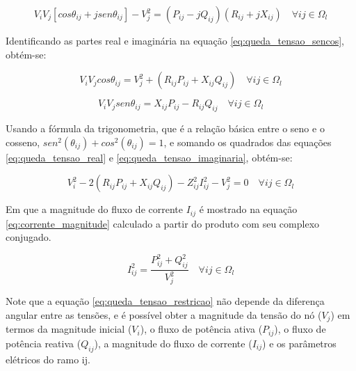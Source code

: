 \begin{equation}
    V_{i}V_{j}[cos\theta_{ij} + jsen\theta_{ij}] - V_{j}^{2} = (P_{ij} - jQ_{ij})(R_{ij} + jX_{ij}) \quad\forall ij \in \Omega_{l}
    \label{eq:queda_tensao_sencos}
\end{equation}

Identificando as partes real e imaginária na equação \ref{eq:queda_tensao_sencos}, obtém-se:

\begin{equation}
    V_{i}V_{j}cos\theta_{ij} = V_{j}^{2} + (R_{ij}P_{ij} + X_{ij}Q_{ij})\quad\forall ij \in \Omega_{l}
    \label{eq:queda_tensao_real}
\end{equation}

\begin{equation}
    V_{i}V_{j}sen\theta_{ij} = X_{ij}P_{ij} - R_{ij}Q_{ij}\quad\forall ij \in \Omega_{l}
    \label{eq:queda_tensao_imaginaria}
\end{equation}

Usando a fórmula da trigonometria, que é a relação básica entre o seno e o cosseno, $sen^{2}(\theta_{ij}) + cos^{2}(\theta_{ij}) = 1$, e somando os quadrados das equações \ref{eq:queda_tensao_real} e \ref{eq:queda_tensao_imaginaria}, obtém-se:

\begin{equation}
    V_{i}^{2} - 2(R_{ij}P_{ij} + X_{ij}Q_{ij}) - Z_{ij}^{2}I_{ij}^{2} - V_{j}^{2} = 0\quad\forall ij \in \Omega_{l}
    \label{eq:queda_tensao_restricao}
\end{equation}

Em que a magnitude do fluxo de corrente $I_{ij}$ é mostrado na equação \ref{eq:corrente_magnitude} calculado a partir do produto com seu complexo conjugado.

\begin{equation}
    I_{ij}^{2} = \frac{P_{ij}^{2}+Q_{ij}^{2}}{V_{j}^{2}}\quad\forall ij \in \Omega_{l}
    \label{eq:corrente_magnitude}
\end{equation}

Note que a equação \ref{eq:queda_tensao_restricao} não depende da diferença angular entre as tensões, e é possível obter a magnitude da tensão do nó ($V_j$) em termos da magnitude inicial ($V_i$), o fluxo de potência ativa ($P_{ij}$), o fluxo de potência reativa ($Q_{ij}$), a magnitude do fluxo de corrente ($I_{ij}$) e os parâmetros elétricos do ramo ij.  